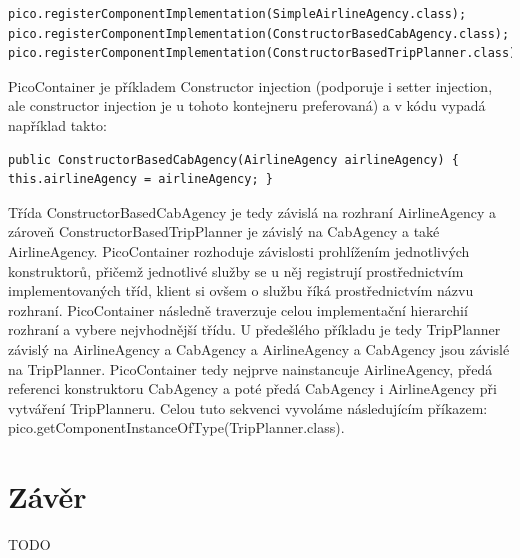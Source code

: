 \documentclass[a4paper,conference]{IEEEtran}
\begin{document}
\lstset{language=Java,caption=Registrace tříd v kontejneru,label=listing:Java}
\begin{lstlisting}
pico.registerComponentImplementation(SimpleAirlineAgency.class); pico.registerComponentImplementation(ConstructorBasedCabAgency.class); pico.registerComponentImplementation(ConstructorBasedTripPlanner.class);
\end{lstlisting}

PicoContainer je příkladem Constructor injection (podporuje i setter injection, ale constructor injection je u tohoto kontejneru preferovaná) a v kódu vypadá například takto:

\lstset{language=Java,caption=Použití PicoContainer,label=listing:Java}
\begin{lstlisting}
public ConstructorBasedCabAgency(AirlineAgency airlineAgency) {  this.airlineAgency = airlineAgency; }
\end{lstlisting}

Třída ConstructorBasedCabAgency je tedy závislá na rozhraní AirlineAgency a zároveň ConstructorBasedTripPlanner je závislý na CabAgency a také AirlineAgency.
PicoContainer rozhoduje závislosti prohlížením jednotlivých konstruktorů, přičemž jednotlivé služby se u něj registrují prostřednictvím implementovaných tříd, klient si ovšem o službu říká prostřednictvím názvu rozhraní. PicoContainer následně traverzuje celou implementační hierarchií rozhraní a vybere nejvhodnější třídu.
U předešlého příkladu je tedy TripPlanner závislý na AirlineAgency a CabAgency a AirlineAgency a CabAgency jsou závislé na TripPlanner. PicoContainer tedy nejprve nainstancuje AirlineAgency, předá referenci konstruktoru CabAgency a poté předá CabAgency i AirlineAgency při vytváření TripPlanneru. Celou tuto sekvenci vyvoláme následujícím příkazem: pico.getComponentInstanceOfType(TripPlanner.class).

\section{Závěr}

TODO



% 
% 
% 
% 
\end{document}
